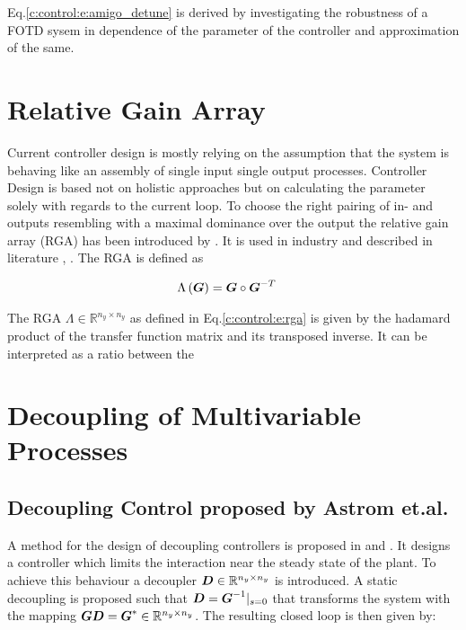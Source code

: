 Eq.\ref{c:control:e:amigo_detune} is derived by investigating the robustness of a FOTD sysem in dependence of the parameter of the controller and approximation of the same.\\

\section{Relative Gain Array} %
\label{c:control:s:rga}

Current controller design is mostly relying on the assumption that the system is behaving like an assembly of single input single output processes. Controller Design is based not on holistic approaches but on calculating the parameter solely with regards to the current loop. To choose the right pairing of in- and outputs resembling with a maximal dominance over the output the relative gain array (RGA) has been introduced by \cite{Bristol1966}. It is used in industry and described in literature \cite[p. 88 ff.]{Skogestad2005}, \cite[p.219 ff.]{Glad2000}. The RGA is defined as

\begin{align}
\begin{split}
\Lambda\left(\mbox{\boldmath$G$}\right) &= \mbox{\boldmath$G$} \circ \mbox{\boldmath$G$}^{-T}
\end{split}
\label{c:control:e:rga}
\end{align}

The RGA $\Lambda \in \mathbb{R}^{n_y \times n_y}$ as defined in Eq.\ref{c:control:e:rga} is given by the hadamard product of the transfer function matrix and its transposed inverse. It can be interpreted as a ratio between the \\

\section{Decoupling of Multivariable Processes} %
\label{c:controller:s:decoupling}

\subsection*{Decoupling Control proposed by Astrom et.al.}
A method for the design of decoupling controllers is proposed in \cite{Astrom2001a} and \cite{Astrom2006AdvancedControl}. It designs a controller which limits the interaction near the steady state of the plant. To achieve this behaviour a decoupler $\mbox{\boldmath$D$} \in  \mathbb{R}^{n_y \times n_y}$ is introduced. A static decoupling is proposed such that $\mbox{\boldmath$D$} = \mbox{\boldmath$G$}^{-1}|_{s=0}$ that transforms the system with the mapping $\mbox{\boldmath$G$} \mbox{\boldmath$D$} = \mbox{\boldmath$G$}^* \in \mathbb{R}^{n_y \times n_y}$. The resulting closed loop is then given by: 

